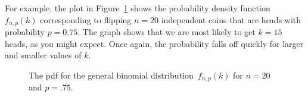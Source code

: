 For example, the plot in Figure~\ref{fig:16F7} shows the probability
density function $f_{n, p}(k)$ corresponding to flipping $n=20$
independent coins that are heads with probability $p = 0.75$.  The
graph shows that we are most likely to get $k = 15$ heads, as
you might expect.  Once again, the probability falls off quickly for
larger and smaller values of $k$.
%
\begin{figure}


\caption{The pdf for the general binomial distribution~$f_{n, p}(k)$
  for $n = 20$ and $p = .75$.}

\label{fig:16F7}

\end{figure}

\iffalse
The cumulative distribution function for the general binomial
distribution is~$F_{n, p}: \reals \to [0,1]$ where
\begin{equation}\label{eqn:16F5}
F_{n, p}(x) =
    \begin{cases}
        0 & \text{if $x < 1$} \\
        \sum_{i = 0}^k \binom{n}{i} p^i (1 - p)^{n - i}
          & \text{if $k \le x < k + 1$ for $1 \le k < n$} \\
        1 & \text{if $n \le x$}.
    \end{cases}
\end{equation}
\fi


